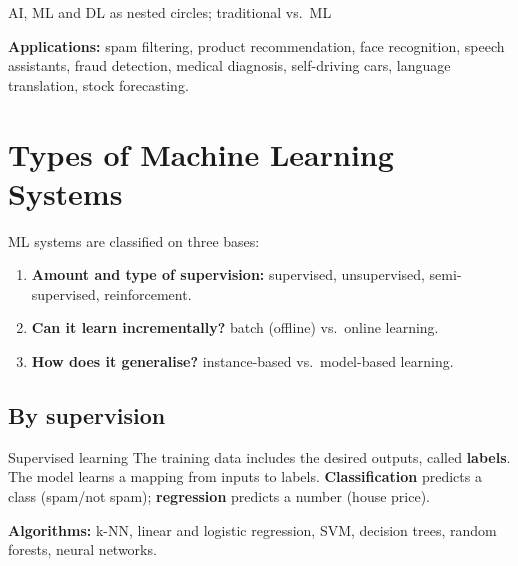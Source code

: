 \begin{drawit}{AI, ML and DL as nested circles; traditional vs.\ ML}
\centering
{}
\end{drawit}

\textbf{Applications:} spam filtering, product recommendation, face recognition, speech assistants, fraud detection, medical diagnosis, self-driving cars, language translation, stock forecasting.

\section{Types of Machine Learning Systems}

ML systems are classified on three bases:
\begin{enumerate}
  \item \textbf{Amount and type of supervision:} supervised, unsupervised, semi-supervised, reinforcement.
  \item \textbf{Can it learn incrementally?} batch (offline) vs.\ online learning.
  \item \textbf{How does it generalise?} instance-based vs.\ model-based learning.
\end{enumerate}

\subsection{By supervision}

\begin{dfn}{Supervised learning}
The training data includes the desired outputs, called \textbf{labels}. The model learns a mapping from inputs to labels. \textbf{Classification} predicts a class (spam/not spam); \textbf{regression} predicts a number (house price).
\end{dfn}
\textbf{Algorithms:} k-NN, linear and logistic regression, SVM, decision trees, random forests, neural networks.

